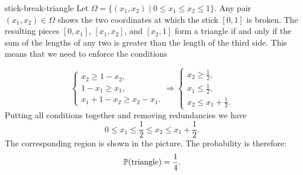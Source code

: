 \begin{sol}{stick-break-triangle}
    Let $\Omega=\{(x_1,x_2)\mid0\le x_1\le x_2\le1\}$. Any pair $(x_1,x_2)\in\Omega$ shows the two coordinates at which the stick $[0,1]$ is broken. The resulting pieces $[0,x_1]$, $[x_1,x_2]$, and $[x_2,1]$ form a triangle if and only if the sum of the lengths of any two is greater than the length of the third side. This means that we need to enforce the conditions
    \begin{figure}
    \centering
    \end{figure}
    \[
        \begin{cases}
            x_2\ge1-x_2,\\
            1-x_1\ge x_1,\\
            x_1+1-x_2\ge x_2-x_1.
        \end{cases}\Longrightarrow\begin{cases}
            x_2\ge\frac12,\\
            x_1\le\frac12,\\
            x_2\le x_1+\frac12.
        \end{cases}
    \]
    Putting all conditions together and removing redundancies we have
    \[
        \textstyle0\le x_1\le\frac12\le x_2\le x_1+\frac12.
    \]
    The corresponding region is shown in the picture. The probability is therefore:
    \[
        \mathbb{P}(\text{triangle})=\frac14.
    \]
\end{sol}